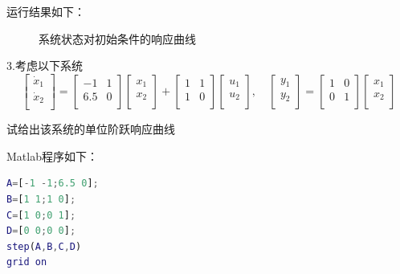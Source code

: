 \documentclass[UTF8]{ctexart}
\begin{document}
\par 运行结果如下：
\par \begin{figure}[h]       
 \caption{\label{1} 系统状态对初始条件的响应曲线} 
 \end{figure}

\par 3.考虑以下系统
\begin{equation}
    \begin{bmatrix}
    \dot x_1\\
    \dot x_2\\
    \end{bmatrix}=\begin{bmatrix}
    -1 & 1 \\
    6.5 & 0 \\ \end{bmatrix}\begin{bmatrix}
    x_1\\
    x_2\\
    \end{bmatrix}+ \begin{bmatrix}
    1 & 1 \\
    1 & 0 \\
    \end{bmatrix}\begin{bmatrix}
    u_1\\
    u_2\\
    \end{bmatrix} ,  \quad \begin{bmatrix}
    y_1\\
    y_2\\
    \end{bmatrix}=\begin{bmatrix}
    1 & 0 \\
    0 & 1 \\ \end{bmatrix}\begin{bmatrix}
    x_1\\
    x_2\\
    \end{bmatrix}
\end{equation}
\par 试给出该系统的单位阶跃响应曲线
\par Matlab程序如下：
\par  \begin{lstlisting}[language=matlab,escapeinside=``]
A=[-1 -1;6.5 0];
B=[1 1;1 0];
C=[1 0;0 1];
D=[0 0;0 0];
step(A,B,C,D)
grid on
\end{lstlisting}
\end{document}
